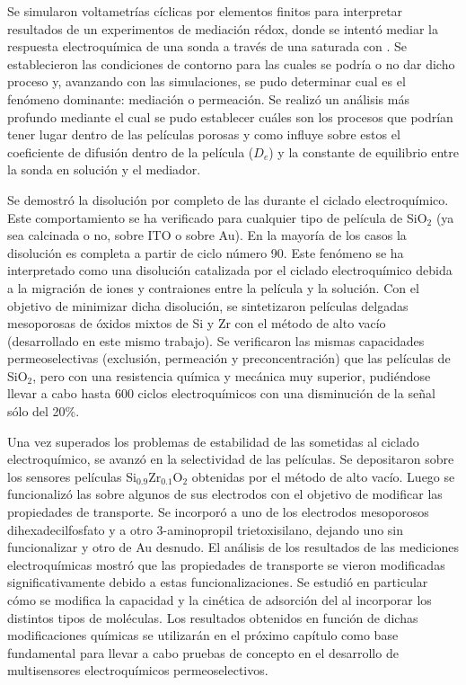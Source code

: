 	Se simularon voltametrías cíclicas por elementos finitos para interpretar resultados de un experimentos de mediación rédox, donde se intentó mediar la respuesta electroquímica de una sonda a través de una \pdm\space saturada con \ru. Se establecieron las condiciones de contorno para las cuales se podría o no dar dicho proceso y, avanzando con las simulaciones, se pudo determinar cual es el fenómeno dominante: mediación o permeación. Se realizó un análisis más profundo mediante el cual se pudo establecer  cuáles son los procesos que podrían tener lugar dentro de las películas porosas y como influye sobre estos el coeficiente de difusión dentro de la película ($D_e$) y la constante de equilibrio entre la sonda en solución y el mediador.

	Se demostró la disolución por completo de las \pdmF\space durante el ciclado electroquímico. Este comportamiento se ha verificado para cualquier tipo de película de SiO$_2$ (ya sea calcinada o no, sobre ITO o sobre Au). En la mayoría de los casos la disolución es completa a partir de ciclo número 90. Este fenómeno se ha interpretado como una disolución catalizada por el ciclado electroquímico debida a la migración de iones y contraiones entre la película y la solución. Con el objetivo de minimizar dicha disolución, se sintetizaron películas delgadas mesoporosas de óxidos mixtos de Si y Zr con el método de alto vacío (desarrollado en este mismo trabajo). Se verificaron las mismas capacidades permeoselectivas (exclusión, permeación y preconcentración) que las películas de SiO$_2$, pero con una resistencia química y mecánica muy superior, pudiéndose llevar a cabo hasta 600 ciclos electroquímicos con una disminución de la señal sólo del 20\%.

	Una vez superados los problemas de estabilidad de las \pdm\space sometidas al ciclado electroquímico, se avanzó en la selectividad de las películas. Se depositaron sobre los sensores películas Si$_{0.9}$Zr$_{0.1}$O$_2$ obtenidas por el método de alto vacío. Luego se funcionalizó las \pdm\space sobre algunos de sus electrodos con el objetivo de modificar las propiedades de transporte. Se incorporó a uno de los electrodos mesoporosos dihexadecilfosfato y a otro 3-aminopropil trietoxisilano, dejando uno sin funcionalizar y otro de Au desnudo. El análisis de los resultados de las mediciones electroquímicas mostró que las propiedades de transporte se vieron modificadas significativamente debido a estas funcionalizaciones. Se estudió en particular cómo se modifica la capacidad y la cinética de adsorción del \aminorutenio\space al incorporar los distintos tipos de moléculas. Los resultados obtenidos en función de dichas modificaciones químicas se utilizarán en el próximo capítulo como base fundamental para llevar a cabo pruebas de concepto en el desarrollo de multisensores electroquímicos permeoselectivos.

